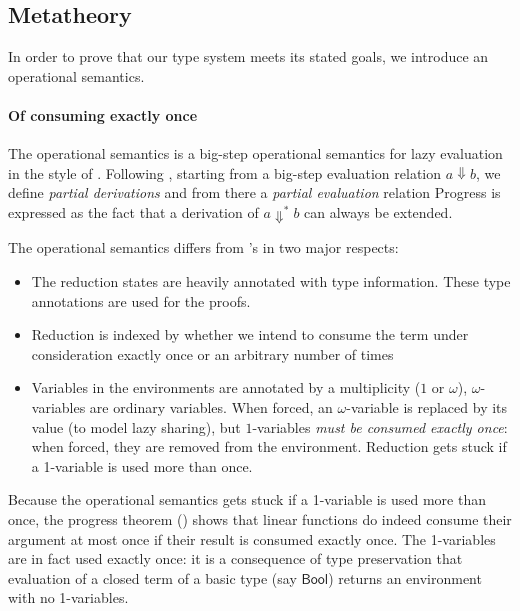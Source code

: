 \documentclass[acmsmall,screen]{acmart}\settopmatter{}
\def\longversion{}
\newcommand{\Conid}[1]{\mathit{#1}}
\renewcommand\Conid[1]{\mathord{\textsf{#1}}}
\begin{document}
\subsection{Metatheory}
\label{sec:metatheory}

In order to prove that our type system meets its stated goals, we
introduce an operational semantics.
\ifx\longversion{}
\fi

\paragraph{Of consuming exactly once}
The operational semantics is a big-step operational semantics for
lazy evaluation in the style of \citet{launchbury_natural_1993}.
Following
\citet{gunter_partial-big-step_1993}, starting from a big-step evaluation
relation $a⇓b$, we define \emph{partial derivations} and from there a
\emph{partial evaluation} relation
\ifx\longversion{}
\fi
Progress is expressed as the
fact that a derivation of $a⇓^*b$ can always be extended.

The operational semantics differs from
\citeauthor{launchbury_natural_1993}'s in two major respects:
\begin{itemize}
\item The reduction states are heavily annotated with type
  information. These type annotations are used for the proofs.
\item Reduction is indexed by whether we intend to consume the term
  under consideration exactly once or an arbitrary number of times
\item Variables in the environments are annotated by a multiplicity
  ($1$ or $ω$), $ω$-variables are ordinary variables. When forced, an
  $ω$-variable is replaced by its value (to model lazy sharing), but
  $1$-variables \emph{must be consumed exactly once}: when forced,
  they are removed from the environment. Reduction gets stuck if a
  1-variable is used more than once.
\end{itemize}
Because the operational semantics gets stuck if a 1-variable is used
more than once, the progress theorem
() shows that linear functions do
indeed consume their argument at most once if their result is consumed
exactly once. The 1-variables are in fact used exactly once: it is a
consequence of type preservation that evaluation of a closed term of a
basic type (say \ensuremath{\Conid{Bool}}) returns an environment with no 1-variables.
\end{document}
